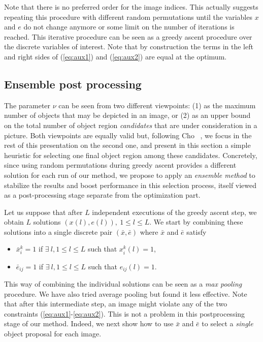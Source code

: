 \documentclass[10pt,twocolumn,letterpaper]{article}
\numberwithin{theorem}{section}
\begin{document}
Note that there
is no preferred order for the image indices. This actually suggests
repeating this procedure with different random permutations until the
variables $x$ and $e$ do not change anymore or some limit on the
number of iterations is reached. This iterative procedure can be seen
as a greedy ascent procedure over the discrete variables of
interest. Note that by construction the terms in the left and right
sides of (\ref{eq:aux1}) and (\ref{eq:aux2}) are equal at the optimum.


\subsection{Ensemble post processing}
\label{subsec:ensemble_method}

The parameter $\nu$ can be seen from two different 
viewpoints: (1) as the maximum number of objects that may be depicted in 
an image, or (2) as an upper bound on the total number of object region 
{\em candidates} that are under consideration in a picture. Both 
viewpoints are equally valid but, following Cho \etal~\cite{CKSP15}, we 
focus in the rest of this presentation on the second one, and present in 
this section a simple heuristic for selecting one final object region 
among these candidates. Concretely, since using random permutations 
during greedy ascent provides a different solution for each run of our 
method, we propose to apply an {\em ensemble method} to stabilize the 
results and boost performance in this selection process, itself viewed 
as a post-processing stage separate from the optimization part.

Let us suppose that after $L$ independent executions of the greedy ascent
step, we obtain $L$ solutions $(x(l), e(l)),\ 1 \leq l \leq L$. We start by combining these solutions into a
single discrete pair $(\bar{x}, \bar{e})$ where $\bar{x}$ and
$\bar{e}$ satisfy
\begin{itemize}
    \vspace{-1mm}
	\item $\bar{x}_i^k = 1$ if $\exists \ l, 1 \leq l \leq L$ such that $x_i^k(l) = 1$,
	\vspace{-1mm}
	\item $\bar{e}_{ij} = 1$ if $\exists \ l, 1 \leq l \leq L$ such that $e_{ij}(l) = 1$. 
	\vspace{-1mm}
\end{itemize}
This way of combining the individual solutions can be seen as a \textit{max pooling} procedure. We have also tried average pooling but found it less effective. Note that after this intermediate step, an image might violate any of the two constraints (\ref{eq:aux1}-\ref{eq:aux2}). This is not a problem in this postprocessing stage of our method. Indeed, we next show how to use $\bar{x}$ and $\bar{e}$ to select a {\em single} object proposal for each image.
\end{document}
